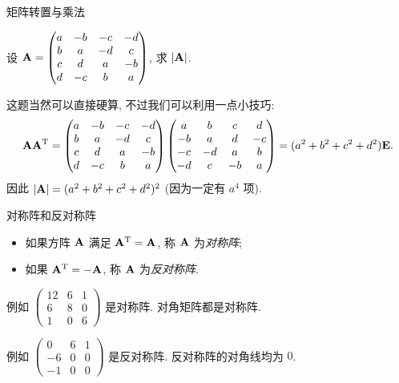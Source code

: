 \begin{frame}{矩阵转置与乘法}
	\onslide<+->
	\begin{example}
		设 ${\mathbf{A}}=\begin{pmatrix}
			a&-b&-c&-d\\
			b&a&-d&c\\
			c&d&a&-b\\
			d&-c&b&a
		\end{pmatrix}$, 求 $|{\mathbf{A}}|$.
	\end{example}
	\onslide<+->
	这题当然可以直接硬算, 不过我们可以利用一点小技巧:
	\[{\mathbf{A}}{\mathbf{A}}^{\mathrm{T}}=\begin{pmatrix}
		a&-b&-c&-d\\
		b&a&-d&c\\
		c&d&a&-b\\
		d&-c&b&a
	\end{pmatrix}\begin{pmatrix}
		a&b&c&d\\
		-b&a&d&-c\\
		-c&-d&a&b\\
		-d&c&-b&a
	\end{pmatrix}=(a^2+b^2+c^2+d^2){\mathbf{E}}.\]
	\onslide<+->
	因此 $|{\mathbf{A}}|=(a^2+b^2+c^2+d^2)^2$ (因为一定有 $a^4$ 项).
\end{frame}


\begin{frame}{对称阵和反对称阵}
	\onslide<+->
	\begin{definition}
		\begin{itemize}
			\item 如果方阵 ${\mathbf{A}}$ 满足 ${\mathbf{A}}^{\mathrm{T}}={\mathbf{A}}$, 称 ${\mathbf{A}}$ 为\emph{对称阵};
			\item 如果 ${\mathbf{A}}^{\mathrm{T}}=-{\mathbf{A}}$, 称 ${\mathbf{A}}$ 为\emph{反对称阵}.
		\end{itemize}
	\end{definition}
	\onslide<+->
	例如 $\begin{pmatrix}
		12&6&1\\
		6&8&0\\
		1&0&6
	\end{pmatrix}$
	是对称阵.
	\onslide<+->
	对角矩阵都是对称阵.
	
	\onslide<+->
	例如 $\begin{pmatrix}
		0&6&1\\
		-6&0&0\\
		-1&0&0
	\end{pmatrix}$
	是反对称阵.
	\onslide<+->
	反对称阵的对角线均为 $0$.
\end{frame}


